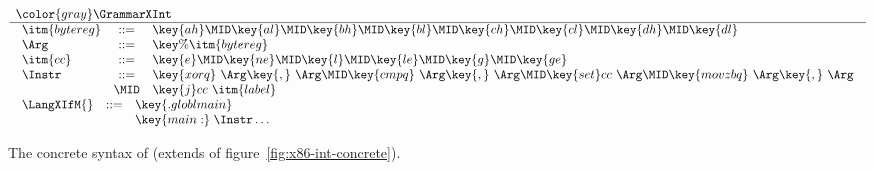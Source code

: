 \documentclass[7x10]{TimesAPriori_MIT}%
\newcommand{\gray}[1]{{\color{gray} #1}}
\numberwithin{theorem}{chapter}
\numberwithin{definition}{chapter}
\numberwithin{equation}{chapter}
\begin{document}
\newcommand{\GrammarXIf}{
\begin{array}{lcl}
  \itm{bytereg} &::=& \key{ah} \MID \key{al} \MID \key{bh} \MID \key{bl}
    \MID \key{ch} \MID \key{cl} \MID \key{dh} \MID \key{dl} \\
\Arg &::=& \key{\%}\itm{bytereg}\\
\itm{cc} & ::= & \key{e} \MID \key{ne} \MID \key{l} \MID \key{le} \MID \key{g} \MID \key{ge} \\
\Instr &::=& \key{xorq}~\Arg\key{,}~\Arg
   \MID \key{cmpq}~\Arg\key{,}~\Arg
    \MID  \key{set}cc~\Arg 
    \MID \key{movzbq}~\Arg\key{,}~\Arg \\
    &\MID& \key{j}cc~\itm{label} \\
\end{array}
}


\begin{figure}[tp]
\begin{tcolorbox}[colback=white]
\[
\begin{array}{l}
  \gray{\GrammarXInt} \\ \hline
  \GrammarXIf \\ 
\begin{array}{lcl}
\LangXIfM{} &::= &  \key{.globl main} \\
      &    & \key{main:} \; \Instr\ldots 
\end{array}
\end{array}
\]
\end{tcolorbox}
\caption{The concrete syntax of \LangXIf{}  (extends \LangXInt{} of figure~\ref{fig:x86-int-concrete}).}
\label{fig:x86-1-concrete}
\end{figure}

\newcommand{\ASTXIfRacket}{
\begin{array}{lcl}
\itm{bytereg} &::=& \key{ah} \MID \key{al} \MID \key{bh} \MID \key{bl}
    \MID \key{ch} \MID \key{cl} \MID \key{dh} \MID \key{dl} \\
\Arg &::=&  \BYTEREG{\itm{bytereg}} \\
\itm{cc} & ::= & \key{e} \MID \key{l} \MID \key{le} \MID \key{g} \MID \key{ge} \\
\Instr &::=& \BININSTR{\code{xorq}}{\Arg}{\Arg}
       \MID \BININSTR{\code{cmpq}}{\Arg}{\Arg}\\
       &\MID& \BININSTR{\code{set}}{\itm{cc}}{\Arg} 
       \MID \BININSTR{\code{movzbq}}{\Arg}{\Arg}\\
       &\MID&  \JMPIF{\itm{cc}}{\itm{label}} 
\end{array}
}
\end{document}
